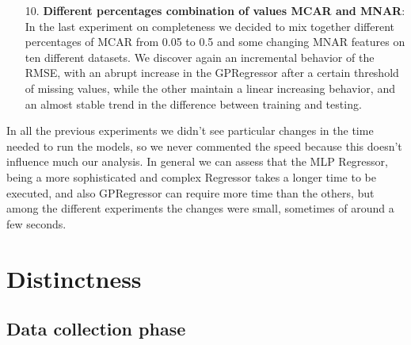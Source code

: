 \documentclass{Configuration_Files/PoliMi3i_thesis}
\begin{document}
\begin{enumerate}
\item[10.] \textbf{Different percentages combination of values MCAR and MNAR}: In the last experiment on completeness we decided to mix together different percentages of MCAR from 0.05 to 0.5 and some changing MNAR features on ten different datasets. We discover again an incremental behavior of the RMSE, with an abrupt increase in the GPRegressor after a certain threshold of missing values, while the other maintain a linear increasing behavior, and an almost stable trend in the difference between training and testing. 
\end{enumerate}
In all the previous experiments we didn't see particular changes in the time needed to run the models, so we never commented the speed because this doesn't influence much our analysis. In general we can assess that the MLP Regressor, being a more sophisticated and complex Regressor takes a longer time to be executed, and also GPRegressor can require more time than the others, but among the different experiments the changes were small, sometimes of around a few seconds. 

\section{Distinctness}
\label{sec:section_2_2}%

\subsection{Data collection phase}
\label{subsec:section_2_2_1}%
\end{document}
